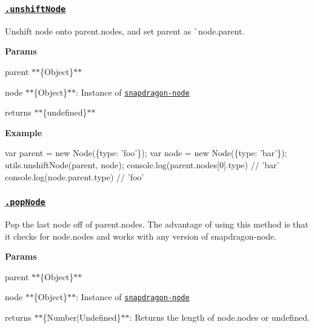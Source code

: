 \subsubsection*{\href{index.js#L325}{\tt .unshift\+Node}}

Unshift {\ttfamily node} onto {\ttfamily parent.\+nodes}, and set {\ttfamily parent} as \`{}node.parent.

{\bfseries Params}


\begin{DoxyItemize}
\item {\ttfamily parent} $\ast$$\ast$\{Object\}$\ast$$\ast$
\item {\ttfamily node} $\ast$$\ast$\{Object\}$\ast$$\ast$\+: Instance of \href{https://github.com/jonschlinkert/snapdragon-node}{\tt snapdragon-\/node}
\item {\ttfamily returns} $\ast$$\ast$\{undefined\}$\ast$$\ast$
\end{DoxyItemize}

{\bfseries Example}


\begin{DoxyCode}
var parent = new Node(\{type: 'foo'\});
var node = new Node(\{type: 'bar'\});
utils.unshiftNode(parent, node);
console.log(parent.nodes[0].type) // 'bar'
console.log(node.parent.type) // 'foo'
\end{DoxyCode}


\subsubsection*{\href{index.js#L354}{\tt .pop\+Node}}

Pop the last {\ttfamily node} off of {\ttfamily parent.\+nodes}. The advantage of using this method is that it checks for {\ttfamily node.\+nodes} and works with any version of {\ttfamily snapdragon-\/node}.

{\bfseries Params}


\begin{DoxyItemize}
\item {\ttfamily parent} $\ast$$\ast$\{Object\}$\ast$$\ast$
\item {\ttfamily node} $\ast$$\ast$\{Object\}$\ast$$\ast$\+: Instance of \href{https://github.com/jonschlinkert/snapdragon-node}{\tt snapdragon-\/node}
\item {\ttfamily returns} $\ast$$\ast$\{Number$\vert$\+Undefined\}$\ast$$\ast$\+: Returns the length of {\ttfamily node.\+nodes} or undefined.
\end{DoxyItemize}

